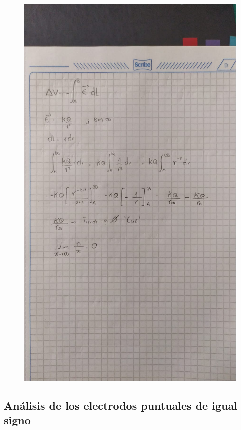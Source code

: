 \documentclass[letterpaper, 12pt]{report}
\begin{document}
\begin{figure}[H]
	\begin{center}
		\includegraphics[scale = .4]{./Images/Proceso.jpeg}
	\end{center}
\end{figure}

\subsection{Análisis de los electrodos puntuales de igual signo}
\end{document}
